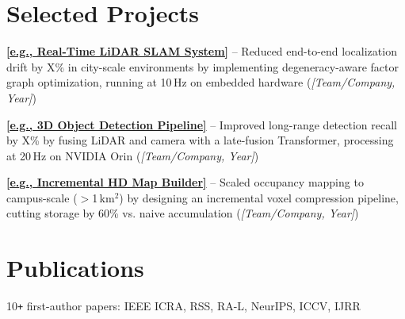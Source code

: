 \documentclass[]{deedy-resume-openfont}
\begin{document}
\begin{minipage}[t]{0.66\textwidth}
\section{Selected Projects}
\vspace{0.3cm}
\begin{tightemize}
\item \href{https://github.com/your-org/lidar-slam}{\textbf{[e.g., Real-Time LiDAR SLAM System]}} -- Reduced end-to-end localization drift by X\% in city-scale environments by implementing degeneracy-aware factor graph optimization, running at 10\,Hz on embedded hardware (\textit{[Team/Company, Year]})
\item \href{https://github.com/your-org/3d-detector}{\textbf{[e.g., 3D Object Detection Pipeline]}} -- Improved long-range detection recall by X\% by fusing LiDAR and camera with a late-fusion Transformer, processing at 20\,Hz on NVIDIA Orin (\textit{[Team/Company, Year]})
\item \href{https://github.com/your-org/hd-map}{\textbf{[e.g., Incremental HD Map Builder]}} -- Scaled occupancy mapping to campus-scale ($>$1\,km$^2$) by designing an incremental voxel compression pipeline, cutting storage by 60\% vs. naive accumulation (\textit{[Team/Company, Year]})
\end{tightemize}
\sectionsep

\section{Publications}
10\texttt{+} first-author papers: IEEE ICRA, RSS, RA-L, NeurIPS, ICCV, IJRR
\sectionsep


\end{minipage}
\end{document}
